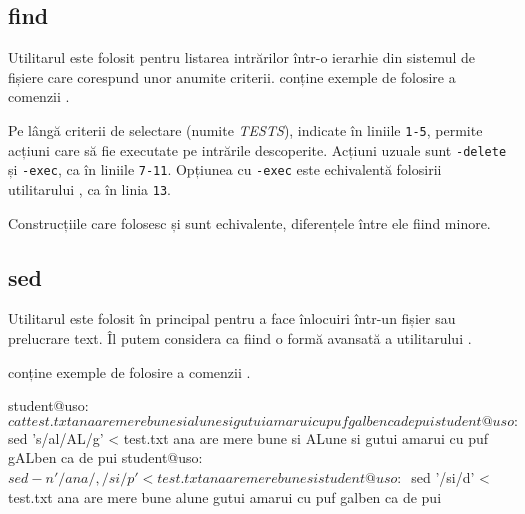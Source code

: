 \subsection{find}
\label{sec:cli:advanced:find}

Utilitarul  este folosit pentru listarea intrărilor într-o ierarhie din
sistemul de fișiere care corespund unor anumite criterii.  conține exemple de folosire a comenzii .


Pe lângă criterii de selectare (numite \textit{TESTS}), indicate în liniile \texttt{1-5},  permite acțiuni care să fie
executate pe intrările descoperite. Acțiuni uzuale sunt \texttt{-delete} și \texttt{-exec}, ca în liniile \texttt{7-11}. Opțiunea cu \texttt{-exec} este echivalentă folosirii utilitarului , ca în linia \texttt{13}.

Construcțiile care folosesc  și  sunt echivalente, diferențele între ele fiind minore.

\subsection{sed}
\label{sec:cli:advanced:sed}

Utilitarul  este folosit în principal pentru a face înlocuiri într-un fișier sau prelucrare text. Îl putem considera ca fiind o formă avansată a utilitarului .

 conține exemple de folosire a comenzii .

\begin{screen}[caption={Folosirea sed},label={lst:cli:sed}]
student@uso:~$ cat test.txt
ana
are
mere
bune
si
alune
si
gutui
amarui
cu
puf
galben
ca
de
pui
student@uso:~$ sed 's/al/AL/g' < test.txt
ana
are
mere
bune
si
ALune
si
gutui
amarui
cu
puf
gALben
ca
de
pui
student@uso:~$ sed -n '/ana/,/si/p' < test.txt
ana
are
mere
bune
si
student@uso:~$ sed '/si/d' < test.txt
ana
are
mere
bune
alune
gutui
amarui
cu
puf
galben
ca
de
pui
\end{screen}


